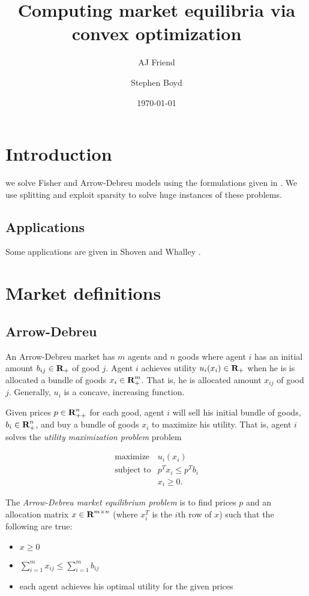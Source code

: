\documentclass{article}
\title{Computing market equilibria via convex optimization}
\author{AJ Friend \and Stephen Boyd}
\date{\today}
\begin{document}
\maketitle

\listoftodos

\section{Introduction}
we solve Fisher and Arrow-Debreu models using the formulations given in . We use splitting and exploit sparsity to solve huge instances of these problems.

\subsection{Applications}
Some applications are given in Shoven and Whalley \cite{shoven1992applying}.

\section{Market definitions}
\subsection{Arrow-Debreu}

An Arrow-Debreu market has $m$ agents and $n$ goods where
agent $i$ has an initial amount $b_{ij} \in {\mbox{\bf R}}_+$ of good $j$.
Agent $i$ achieves utility $u_i(x_i) \in {\mbox{\bf R}}_+$ when he is is allocated a bundle of goods $x_i \in {\mbox{\bf R}}^m_{+}$.
That is, he is allocated amount $x_{ij}$ of good $j$.
Generally, $u_i$ is a concave, increasing function.

Given prices $p \in {\mbox{\bf R}}^n_{++}$ for each good, agent $i$ will sell his initial bundle of goods, $b_i \in {\mbox{\bf R}}^n_+ $, and buy a bundle of goods $x_i$ to maximize his utility.
That is, agent $i$ solves the \emph{utility maximization problem} problem

\begin{equation}
\label{p-ump}
\begin{array}{ll}
\mbox{maximize} & u_i(x_i) \\
\mbox{subject to} & p^T x_i \leq p^T b_i \\
& x_i \geq 0.
\end{array}
\end{equation}

The \emph{Arrow-Debreu market equilibrium problem} is to find prices $p$ and an allocation matrix $x \in {\mbox{\bf R}}^{m \times n}$ (where $x_i^T$ is the $i$th row of $x$) such that the following are true:
\begin{itemize}
\item $x \geq 0$
\item $\sum_{i=1}^m x_{ij} \leq \sum_{i=1}^m b_{ij}$
\item each agent achieves his optimal utility for the given prices
\end{itemize}
\end{document}

